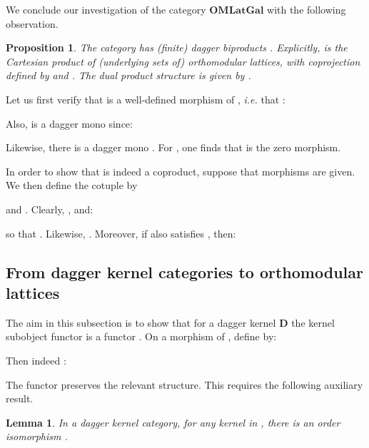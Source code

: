 \documentclass{article}
\newif\ifignore \ignorefalse
\newcommand{\auxproof}[1]{
\ifignore\mbox{}\newline
\textbf{PROOF:} \dotfill\newline
{\it #1}\mbox{}\newline
\textbf{ENDPROOF}\dotfill
\fi}
\newtheorem{lemma}[theorem]{Lemma}
\newtheorem{proposition}[theorem]{Proposition}
\newenvironment{proof}[1][Proof]{ \begin{trivlist}\item[\hskip \labelsep {\bfseries #1}]}{ \end{trivlist}}
\newcommand{\Cat}[1]{\ensuremath{\mathbf{#1}}}
\begin{document}
We conclude our investigation of the category \Cat{OMLatGal} with
the following observation.


\begin{proposition}
\label{BiprodProp}
The category  has (finite) dagger biproducts .
Explicitly,  is the Cartesian product of (underlying
sets of) orthomodular lattices, with coprojection  defined by  and
. The dual product structure is given by
.
\end{proposition}



\begin{proof}
  Let us first verify that  is a well-defined morphism of
  , \textit{i.e.} that :


\noindent Also,  is a dagger mono since:
 

\noindent Likewise, there is a dagger mono . For , one finds that  is the zero morphism.

\auxproof{

}

In order to show that  is indeed a coproduct, suppose
that morphisms  are given.  We then define the
cotuple  by

and . Clearly,
, and:

\auxproof{
  
}



\auxproof{

}

\noindent so that . Likewise, . Moreover,
if  also satisfies
, then:

\end{proof}




\subsection{From dagger kernel categories to orthomodular lattices}

The aim in this subsection is to show that for a dagger kernel \Cat{D}
the kernel subobject functor  is a functor . On a morphism  of
, define  by:


\noindent Then indeed : 


\auxproof{
As a result we get a functor , since:

}

\noindent The functor  preserves the relevant
structure. This requires the following auxiliary result.


\begin{lemma}
\label{lem:kernelschangeofbase}
In a dagger kernel category, for any kernel  in , there is an order isomorphism .
\end{lemma}
\end{document}
